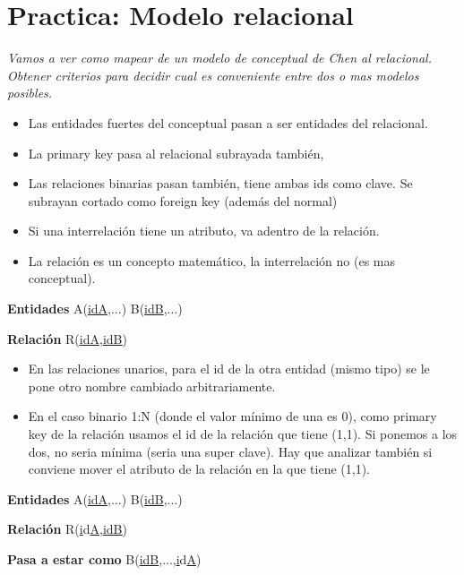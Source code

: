 \section{Practica: Modelo relacional}
\textit{Vamos a ver como mapear de un modelo de conceptual de Chen al relacional.
Obtener criterios para decidir cual es conveniente entre dos o mas modelos posibles.}

\begin{itemize}
\item Las entidades fuertes del conceptual pasan a ser entidades del relacional. 
\item La primary key pasa al relacional subrayada también,
\item Las relaciones binarias pasan también, tiene ambas ids como clave. Se subrayan cortado como foreign key (además del normal)
\item Si una interrelación tiene un atributo, va adentro de la relación.
\item La relación es un concepto matemático, la interrelación no (es mas conceptual).
\end{itemize}


\textbf{Entidades} A(\underline{idA},...) B(\underline{idB},...)

\medskip

\textbf{Relación} R(\underline{\underline{i}d\underline{A}},\underline{\underline{i}d\underline{B}})

\medskip

\begin{itemize}
\item En las relaciones unarios, para el id de la otra entidad (mismo tipo) se le pone otro nombre cambiado arbitrariamente.
\item En el caso binario 1:N (donde el valor mínimo de una es 0), como primary key de la relación usamos el id de la relación que tiene (1,1). Si ponemos a los dos, no seria mínima (seria una super clave). Hay que analizar también si conviene mover el atributo de la relación en la que tiene (1,1).
\end{itemize}

\medskip

\textbf{Entidades}
A(\underline{idA},...)
B(\underline{idB},...)

\medskip

\textbf{Relación}
R(\underline{i}d\underline{A},\underline{\underline{i}d\underline{B}})

\medskip

\textbf{Pasa a estar como}
B(\underline{idB},...,\underline{i}d\underline{A})


